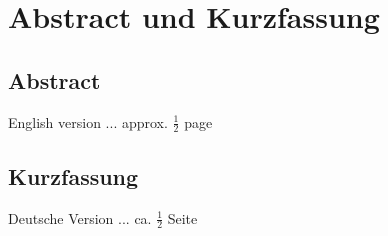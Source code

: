 %
\chapter*{Abstract und Kurzfassung}
%

%
\section*{Abstract}
%
English version ... approx. $\frac{1}{2}$ page


%
\section*{Kurzfassung}
%
Deutsche Version ... ca. $\frac{1}{2}$ Seite










